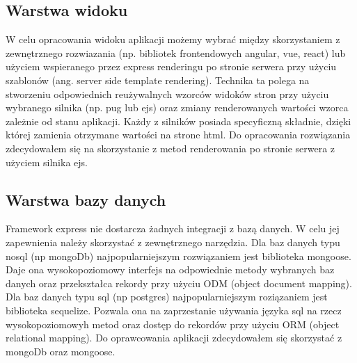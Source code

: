 \documentclass[12pt]{report}
\begin{document}
    \subsection{Warstwa widoku}
      W celu opracowania widoku aplikacji możemy wybrać między skorzystaniem z zewnętrznego rozwiazania (np. bibliotek frontendowych angular, vue, react) lub użyciem wspieranego przez express renderingu po stronie serwera przy użyciu szablonów (ang. server side template rendering).
      Technika ta polega na stworzeniu odpowiednich reużywalnych wzorców widoków stron przy użyciu wybranego silnika (np. pug lub ejs) oraz zmiany renderowanych wartości wzorca zależnie od stanu aplikacji. 
      Każdy z silników posiada specyficzną składnie, dzięki której zamienia otrzymane wartości na strone html.
      Do opracowania rozwiązania zdecydowałem się na skorzystanie z metod renderowania po stronie serwera z użyciem silnika ejs.

    \subsection{Warstwa bazy danych}
      Framework express nie dostarcza żadnych integracji z bazą danych. 
      W celu jej zapewnienia należy skorzystać z zewnętrznego narzędzia.
      Dla baz danych typu nosql (np mongoDb) najpopularniejszym rozwiązaniem jest biblioteka mongoose.
      Daje ona wysokopoziomowy interfejs na odpowiednie metody wybranych baz danych oraz przekształca rekordy przy użyciu ODM (object document mapping).
      Dla baz danych typu sql (np postgres) najpopularniejszym roziązaniem jest biblioteka sequelize.
      Pozwala ona na zaprzestanie używania języka sql na rzecz wysokopoziomowyh metod oraz dostęp do rekordów przy użyciu ORM (object relational mapping).
      Do oprawcowania aplikacji zdecydowałem się skorzystać z mongoDb oraz mongoose.
\end{document}

